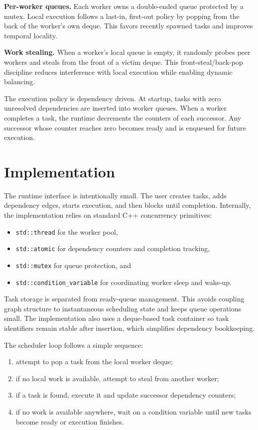 \documentclass[10pt]{article}
\begin{document}
\textbf{Per-worker queues.} Each worker owns a double-ended queue protected by a mutex. Local execution follows a last-in, first-out policy by popping from the back of the worker's own deque. This favors recently spawned tasks and improves temporal locality.

\textbf{Work stealing.} When a worker's local queue is empty, it randomly probes peer workers and steals from the front of a victim deque. This front-steal/back-pop discipline reduces interference with local execution while enabling dynamic balancing.

The execution policy is dependency driven. At startup, tasks with zero unresolved dependencies are inserted into worker queues. When a worker completes a task, the runtime decrements the counters of each successor. Any successor whose counter reaches zero becomes ready and is enqueued for future execution.

\section{Implementation}
The runtime interface is intentionally small. The user creates tasks, adds dependency edges, starts execution, and then blocks until completion. Internally, the implementation relies on standard C++ concurrency primitives:
\begin{itemize}
    \item \texttt{std::thread} for the worker pool,
    \item \texttt{std::atomic} for dependency counters and completion tracking,
    \item \texttt{std::mutex} for queue protection, and
    \item \texttt{std::condition\_variable} for coordinating worker sleep and wake-up.
\end{itemize}

Task storage is separated from ready-queue management. This avoids coupling graph structure to instantaneous scheduling state and keeps queue operations small. The implementation also uses a deque-based task container so task identifiers remain stable after insertion, which simplifies dependency bookkeeping.

The scheduler loop follows a simple sequence:
\begin{enumerate}
    \item attempt to pop a task from the local worker deque;
    \item if no local work is available, attempt to steal from another worker;
    \item if a task is found, execute it and update successor dependency counters;
    \item if no work is available anywhere, wait on a condition variable until new tasks become ready or execution finishes.
\end{enumerate}
\end{document}
